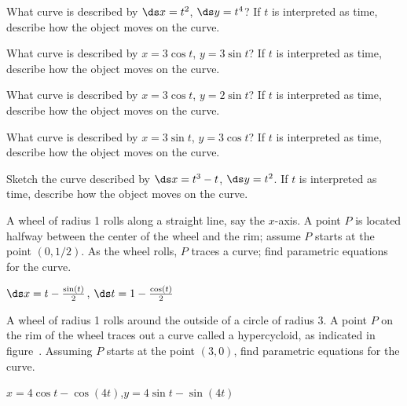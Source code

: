 \begin{exercises}

\begin{exercise} What curve is described by $\ds x=t^2$, $\ds y=t^4$? If $t$ is
interpreted as time, describe how the object moves on the curve.

\begin{exercise} What curve is described by $x=3\cos t$, $y=3\sin t$? If $t$ is
interpreted as time, describe how the object moves on the curve.

\begin{exercise} What curve is described by $x=3\cos t$, $y=2\sin t$? If $t$ is
interpreted as time, describe how the object moves on the curve.

\begin{exercise} What curve is described by $x=3\sin t$, $y=3\cos t$? If $t$ is
interpreted as time, describe how the object moves on the curve.

\begin{exercise} Sketch the curve described by $\ds x=t^3-t$, $\ds y=t^2$. If $t$ is
interpreted as time, describe how the object moves on the curve.

\begin{exercise} A wheel of radius 1 rolls along a straight line, say the
$x$-axis. A point $P$ is located halfway between the center of the
wheel and the rim; assume $P$ starts at the point $(0,1/2)$. As the
wheel rolls, $P$ traces a curve; find parametric equations for the
curve.
\label{exer:pseudo cycloid}
\begin{answer} $\ds x=t-{\sin(t)\over2}$, $\ds t=1-{\cos(t)\over2}$
\end{answer}\end{exercise}

\begin{exercise} A wheel of radius 1 rolls around the outside of a circle of
radius 3. A point $P$ on the rim of the wheel traces out a curve
called a {\dfont hypercycloid}, as indicated in
figure~.  Assuming $P$
starts at the point $(3,0)$, find parametric equations for the curve.
\begin{answer} $x=4\cos t-\cos(4t)$,\hfill\break  $y=4\sin t-\sin(4t)$
\end{answer}\end{exercise}
\label{exer:hypercycloid}


\end{exercise}
\end{exercise}
\end{exercise}
\end{exercise}
\end{exercise}
\end{exercises}
